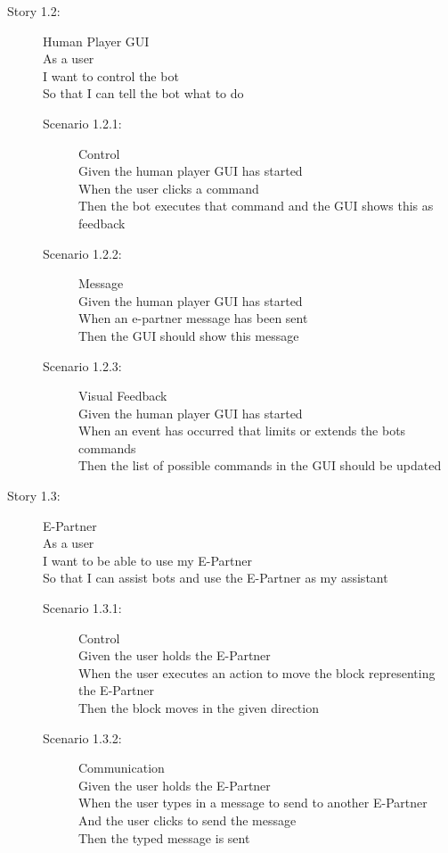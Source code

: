 \begin{description}
	\item[Story 1.2:] Human Player GUI\\
	As a user \\
	I want to control the bot\\
	So that I can tell the bot what to do

	\begin{description}
		\item[Scenario 1.2.1:] Control\\
		Given the human player GUI has started\\
		When the user clicks a command\\
		Then the bot executes that command and the GUI shows this as feedback

		\item[Scenario 1.2.2:] Message\\
		Given the human player GUI has started\\
		When an e-partner message has been sent\\
		Then the GUI should show this message

		\item[Scenario 1.2.3:] Visual Feedback\\
		Given the human player GUI has started\\
		When an event has occurred that limits or extends the bots commands\\
		Then the list of possible commands in the GUI should be updated
		\end{description}
	\end{description}

\begin{description}
	\item[Story 1.3:] E-Partner\\
	As a user\\
	I want to be able to use my E-Partner\\
	So that I can assist bots and use the E-Partner as my assistant

	\begin{description}
		\item[Scenario 1.3.1:] Control\\
		Given the user holds the E-Partner\\
		When the user executes an action to move the block representing the E-Partner\\
		Then the block moves in the given direction
		
		\item[Scenario 1.3.2:] Communication\\
		Given the user holds the E-Partner\\
		When the user types in a message to send to another E-Partner\\
		And the user clicks to send the message\\
		Then the typed message is sent
	\end{description}
\end{description}

